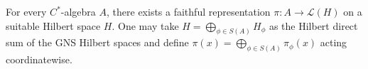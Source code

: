 For every $C^*$-algebra $A$, there exists a faithful representation $\pi : A \to \mathcal{L}(H)$ on a suitable Hilbert space $H$. One may take $H = \bigoplus_{\phi \in S(A)} H_\phi$ as the Hilbert direct sum of the GNS Hilbert spaces and define $\pi(x) = \bigoplus_{\phi \in S(A)} \pi_\phi(x)$ acting coordinatewise.
